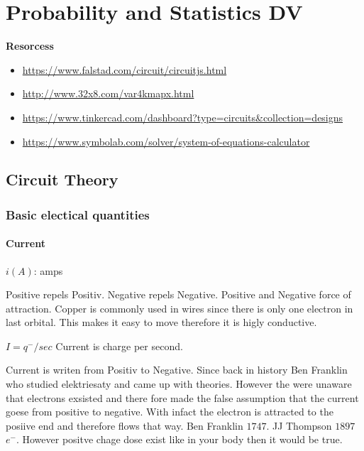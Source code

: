 \chapter{Probability and Statistics DV}

\textbf{Resorcess}
\begin{itemize}
    \item \url{https://www.falstad.com/circuit/circuitjs.html}
    \item \url{http://www.32x8.com/var4kmapx.html}
    \item \url{https://www.tinkercad.com/dashboard?type=circuits&collection=designs}
    \item \url{https://www.symbolab.com/solver/system-of-equations-calculator}
\end{itemize}

\newpage

\section{Circuit Theory}
\subsection{Basic electical quantities}
\subsubsection{Current}
$i (A)$: amps \newline

Positive repels Positiv. Negative repels Negative. Positive and Negative force of attraction.
Copper is commonly used in wires since there is only one electron in last orbital. This makes it easy
to move therefore it is higly conductive. \newline

$I = q^{-} / sec$ Current is charge per second. \newline

Current is writen from Positiv to Negative. Since back in history Ben Franklin who studied elektriesaty and
came up with theories. However the were unaware that electrons exsisted and there fore made the false
assumption that the current goese from positive to negative. With infact the electron is attracted to
the posiive end and therefore flows that way.
Ben Franklin $1747$.
JJ Thompson $1897$ $e^{-}$.
However positve chage dose exist like in your body then it would be true. \newline

